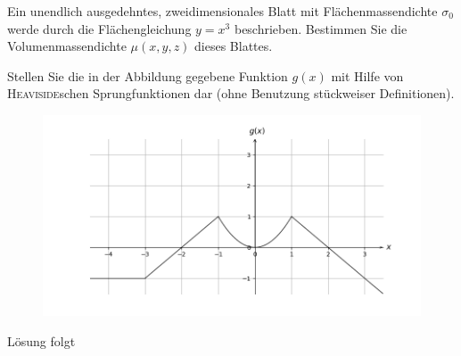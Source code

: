 \documentclass{atistandalonetask}
\begin{document}
  \begin{atiTask}[
    title = Heaviside-Funktion und Delta-Distribution
  ]
\begin{atiSubtasks}
\item Ein unendlich ausgedehntes, zweidimensionales Blatt mit Flächenmassendichte $\sigma_0$ werde durch die Flächengleichung $y=x^3$ beschrieben. Bestimmen Sie die Volumenmassendichte $\mu(x,y,z)$ dieses Blattes. 

\item Stellen Sie die in der Abbildung gegebene Funktion $g(x)$ mit Hilfe von \textsc{Heaviside}schen Sprungfunktionen dar (ohne Benutzung stückweiser Definitionen).  
  \begin{figure}[H]
\centering
\includegraphics[width=0.8\linewidth]{./picture-heaviside_iib}

\end{figure}
\end{atiSubtasks}
  	
  \end{atiTask}
  \begin{atiSolution}
   	Lösung folgt
  \end{atiSolution}
\end{document}
